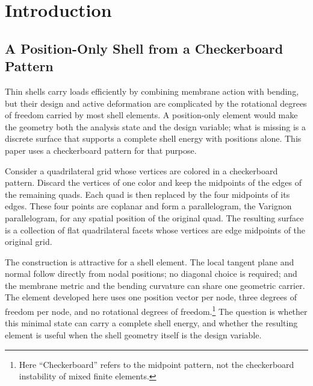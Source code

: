 \section{Introduction}
\label{sec:intro}

\subsection{A Position-Only Shell from a Checkerboard Pattern}
\label{sec:intro-checkerboard}

Thin shells carry loads efficiently by combining membrane action with bending,
but their design and active deformation are complicated by the rotational
degrees of freedom carried by most shell elements. A position-only element would make the
geometry both the analysis state and the design variable; what is missing is a
discrete surface that supports a complete shell energy with positions alone.
This paper uses a checkerboard pattern for that purpose.

Consider a quadrilateral grid whose vertices are colored in a checkerboard
pattern. Discard the vertices of one color and keep the midpoints of the edges
of the remaining quads. Each quad is then replaced by the four midpoints of its
edges. These four points are coplanar and form a parallelogram, the Varignon
parallelogram, for any spatial position of the original quad. The resulting
surface is a collection of flat quadrilateral facets whose vertices are edge
midpoints of the original grid.

The construction is attractive for a shell element. The local tangent plane and
normal follow directly from nodal positions; no diagonal choice is required; and
the membrane metric and the bending curvature can share one geometric carrier.
The element developed here uses one position vector per node, three degrees of
freedom per node, and no rotational degrees of freedom.\footnote{Here
``Checkerboard'' refers to the midpoint pattern, not the checkerboard
instability of mixed finite elements.} The question is whether this minimal
state can carry a complete shell energy, and whether the resulting element is
useful when the shell geometry itself is the design variable.



